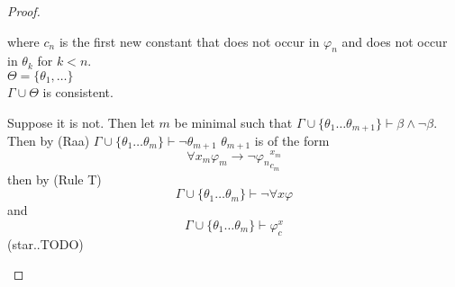 \begin{proof}
\begin{enumerate}
        where $c_n$ is the first new constant that does not occur in $\varphi_n$ and does not occur in $\theta_k$ for $k<n$.\\
        $\Theta = \{\theta_1,\dots \}$\\
         $\Gamma \cup \Theta$ is consistent.
        \begin{claimproof}
            Suppose it is not. Then let $m$ be minimal such that $\Gamma\cup \{\theta_1 \dots \theta_{m+1}\}\vdash \beta \land \lnot \beta$.
            Then by (Raa) $\Gamma\cup \{\theta_1 \dots \theta_{m}\}\vdash \lnot \theta_{m+1}$
            $\theta_{m+1}$ is of the form $$\forall x_m \varphi_m \to \lnot{\varphi_n}^{x_m}_{c_m}$$
            then by (Rule T) $$\Gamma\cup \{\theta_1 \dots \theta_{m}\}\vdash \lnot \forall x \varphi$$ and 
            $$\Gamma\cup \{\theta_1 \dots \theta_{m}\}\vdash \varphi_c^x$$ (star..TODO)
            

\end{claimproof}
\end{enumerate}
\end{proof}
